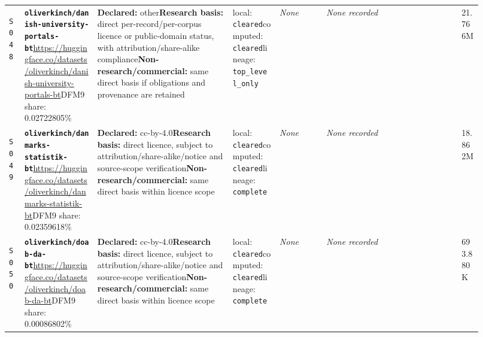 \documentclass[9pt,a4paper]{article}
\newcommand{\srcid}[1]{\hypertarget{src:#1}{\texttt{#1}}}
\begin{document}
\begin{landscape}
\begin{longtable}{@{}L{0.03\linewidth}L{0.14\linewidth}L{0.26\linewidth}L{0.09\linewidth}L{0.09\linewidth}L{0.265\linewidth}L{0.045\linewidth}@{}}
\srcid{S048} & \textbf{\nolinkurl{oliverkinch/danish-university-portals-bt}}\newline \url{https://huggingface.co/datasets/oliverkinch/danish-university-portals-bt}\newline DFM9 share: 0.02722805\% & \textbf{Declared:} other\newline \textbf{Research basis:} direct per-record/per-corpus licence or public-domain status, with attribution/share-alike compliance\newline \textbf{Non-research/commercial:} same direct basis if obligations and provenance are retained & local: \texttt{cleared}\newline computed: \texttt{cleared}\newline lineage: \texttt{top\_level\_only} & \textit{None} & \textit{None recorded} & 21.766M \\
\srcid{S049} & \textbf{\nolinkurl{oliverkinch/danmarks-statistik-bt}}\newline \url{https://huggingface.co/datasets/oliverkinch/danmarks-statistik-bt}\newline DFM9 share: 0.02359618\% & \textbf{Declared:} cc-by-4.0\newline \textbf{Research basis:} direct licence, subject to attribution/share-alike/notice and source-scope verification\newline \textbf{Non-research/commercial:} same direct basis within licence scope & local: \texttt{cleared}\newline computed: \texttt{cleared}\newline lineage: \texttt{complete} & \textit{None} & \textit{None recorded} & 18.862M \\
\srcid{S050} & \textbf{\nolinkurl{oliverkinch/doab-da-bt}}\newline \url{https://huggingface.co/datasets/oliverkinch/doab-da-bt}\newline DFM9 share: 0.00086802\% & \textbf{Declared:} cc-by-4.0\newline \textbf{Research basis:} direct licence, subject to attribution/share-alike/notice and source-scope verification\newline \textbf{Non-research/commercial:} same direct basis within licence scope & local: \texttt{cleared}\newline computed: \texttt{cleared}\newline lineage: \texttt{complete} & \textit{None} & \textit{None recorded} & 693.880K \\

\end{longtable}
\end{landscape}
\end{document}
